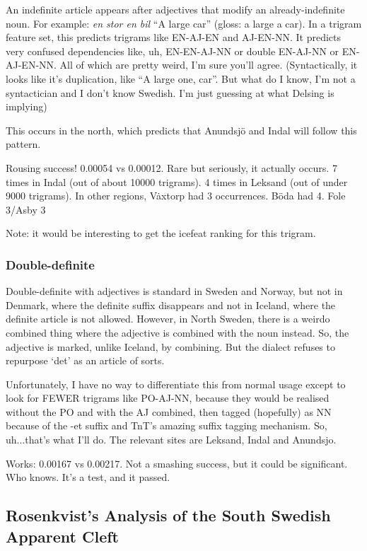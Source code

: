 An indefinite article appears after adjectives that modify an
already-indefinite noun. For example: {\it en stor en bil} ``A large
car'' (gloss: a large a car). In a trigram feature set, this predicts
trigrams like EN-AJ-EN and AJ-EN-NN. It predicts very confused
dependencies like, uh, EN-EN-AJ-NN or double EN-AJ-NN or
EN-AJ-EN-NN. All of which are pretty weird, I'm sure you'll
agree. (Syntactically, it looks like it's duplication, like ``A large
one, car''. But what do I know, I'm not a syntactician and I don't
know Swedish. I'm just guessing at what Delsing is implying)

This occurs in the north, which predicts that Anundsj\"o and Indal
will follow this pattern.

Rousing success! 0.00054 vs 0.00012. Rare but seriously, it actually
occurs. 7 times in Indal (out of about 10000 trigrams). 4 times in
Leksand (out of under 9000 trigrams). In other regions, V\.axtorp had
3 occurrences. B\"oda had 4. Fole 3/Asby 3

Note: it would be interesting to get the icefeat ranking for this trigram.

\subsubsection{Double-definite}

Double-definite with adjectives is standard in Sweden and Norway, but
not in Denmark, where the definite suffix disappears and not in
Iceland, where the definite article is not allowed. However, in North
Sweden, there is a weirdo combined thing where the adjective is
combined with the noun instead. So, the adjective is marked, unlike
Iceland, by combining. But the dialect refuses to repurpose `det' as
an article of sorts.

Unfortunately, I have no way to differentiate this from normal usage
except to look for FEWER trigrams like PO-AJ-NN, because they would be
realised without the PO and with the AJ combined, then tagged
(hopefully) as NN because of the -et suffix and TnT's amazing suffix
tagging mechanism. So, uh...that's what I'll do. The relevant sites
are Leksand, Indal and Anundsjo.

Works: 0.00167 vs 0.00217. Not a smashing success, but it could be
significant. Who knows. It's a test, and it passed.

\subsection{Rosenkvist's Analysis of the South Swedish Apparent Cleft}

